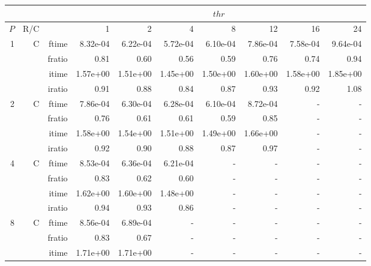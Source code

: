 \documentclass[a4paper]{article}
\begin{document}
\begin{table}[htbp]
\begin{center}
\begin{small}
\begin{tabular}{|r|r|r|r|r|r|r|r|r|r|}
\hline 
     & & & \multicolumn{7}{c|}{$thr$} \\ \hline
    $P$ & R/C &  & 1           & 2    & 4    & 8    & 12   & 16    & 24  \\ \hline\hline
     1 & C & ftime & 8.32e-04 & 6.22e-04 & 5.72e-04 & 6.10e-04 & 7.86e-04 & 7.58e-04 & 9.64e-04 \\   
          &      & fratio & 0.81 & 0.60 & 0.56 & 0.59 & 0.76 & 0.74 & 0.94 \\   
          &      & itime & 1.57e+00 & 1.51e+00 & 1.45e+00 & 1.50e+00 & 1.60e+00 & 1.58e+00 & 1.85e+00 \\   
          &      & iratio & 0.91 & 0.88 & 0.84 & 0.87 & 0.93 & 0.92 & 1.08 \\ \hline 
     2 & C & ftime & 7.86e-04 & 6.30e-04 & 6.28e-04 & 6.10e-04 & 8.72e-04 &     -     &     -     \\   
          &      & fratio & 0.76 & 0.61 & 0.61 & 0.59 & 0.85 &     -     &     -     \\   
          &      & itime & 1.58e+00 & 1.54e+00 & 1.51e+00 & 1.49e+00 & 1.66e+00 &     -     &     -     \\   
          &      & iratio & 0.92 & 0.90 & 0.88 & 0.87 & 0.97 &     -     &     -     \\ \hline 
     4 & C & ftime & 8.53e-04 & 6.36e-04 & 6.21e-04 &     -     &     -     &     -     &     -     \\   
          &      & fratio & 0.83 & 0.62 & 0.60 &     -     &     -     &     -     &     -     \\   
          &      & itime & 1.62e+00 & 1.60e+00 & 1.48e+00 &     -     &     -     &     -     &     -     \\   
          &      & iratio & 0.94 & 0.93 & 0.86 &     -     &     -     &     -     &     -     \\ \hline 
     8 & C & ftime & 8.56e-04 & 6.89e-04 &     -     &     -     &     -     &     -     &     -     \\   
          &      & fratio & 0.83 & 0.67 &     -     &     -     &     -     &     -     &     -     \\   
          &      & itime & 1.71e+00 & 1.71e+00 &     -     &     -     &     -     &     -     &     -     \\   

\end{tabular}
\end{small}
\end{center}
\end{table}
\end{document}
